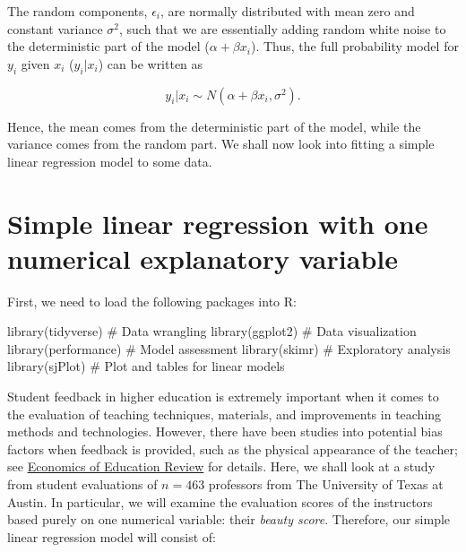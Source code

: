 \documentclass[
  letterpaper,
  DIV=11,
  numbers=noendperiod]{scrartcl}
\newenvironment{Shaded}{\begin{snugshade}}{\end{snugshade}}
\newcommand{\CommentTok}[1]{\textcolor[rgb]{0.37,0.37,0.37}{#1}}
\newcommand{\FunctionTok}[1]{\textcolor[rgb]{0.28,0.35,0.67}{#1}}
\newcommand{\NormalTok}[1]{\textcolor[rgb]{0.00,0.23,0.31}{#1}}
\begin{document}
The random components, \(\epsilon_i\), are normally distributed with
mean zero and constant variance \(\sigma^2\), such that we are
essentially adding random white noise to the deterministic part of the
model (\(\alpha + \beta x_i\)). Thus, the full probability model for
\(y_i\) given \(x_i\) (\(y_i | x_i\)) can be written as

\[y_i | x_i \sim N(\alpha + \beta x_i, \sigma^2).\]

Hence, the mean comes from the deterministic part of the model, while
the variance comes from the random part. We shall now look into fitting
a simple linear regression model to some data.

\section{Simple linear regression with one numerical explanatory
variable}\label{simple-linear-regression-with-one-numerical-explanatory-variable}

First, we need to load the following packages into R:

\begin{Shaded}
\begin{Highlighting}[]
\FunctionTok{library}\NormalTok{(tidyverse)    }\CommentTok{\# Data wrangling }
\FunctionTok{library}\NormalTok{(ggplot2)      }\CommentTok{\# Data visualization}
\FunctionTok{library}\NormalTok{(performance)  }\CommentTok{\# Model assessment}
\FunctionTok{library}\NormalTok{(skimr)        }\CommentTok{\# Exploratory analysis}
\FunctionTok{library}\NormalTok{(sjPlot)       }\CommentTok{\# Plot and tables for linear models}
\end{Highlighting}
\end{Shaded}

Student feedback in higher education is extremely important when it
comes to the evaluation of teaching techniques, materials, and
improvements in teaching methods and technologies. However, there have
been studies into potential bias factors when feedback is provided, such
as the physical appearance of the teacher; see
\href{https://www.journals.elsevier.com/economics-of-education-review/}{Economics
of Education Review} for details. Here, we shall look at a study from
student evaluations of \(n=463\) professors from The University of Texas
at Austin. In particular, we will examine the evaluation scores of the
instructors based purely on one numerical variable: their \emph{beauty
score}. Therefore, our simple linear regression model will consist of:
\end{document}
